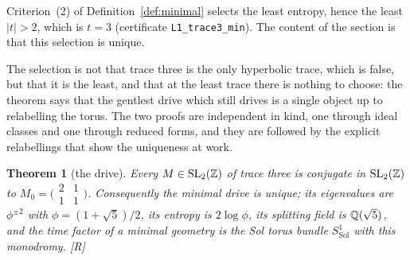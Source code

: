 \documentclass[11pt,a4paper]{article}
\theoremstyle{plain}
\newtheorem{theorem}{Theorem}[section]
\theoremstyle{definition}
\theoremstyle{remark}
\newcommand{\Sol}{\mathrm{Sol}}
\newcommand{\rigR}{[\textup{R}]}
\begin{document}
Criterion~(2) of Definition~\ref{def:minimal} selects the least entropy, hence the least $\lvert t\rvert>2$, which is $t=3$ (certificate \texttt{L1\_trace3\_min}). The content of the section is that this selection is unique.

The selection is not that trace three is the only hyperbolic trace, which is false, but that it is the least, and that at the least trace there is nothing to choose: the theorem says that the gentlest drive which still drives is a single object up to relabelling the torus. The two proofs are independent in kind, one through ideal classes and one through reduced forms, and they are followed by the explicit relabellings that show the uniqueness at work.

\begin{theorem}[the drive]\label{thm:drive}
Every $M\in\mathrm{SL}_{2}(\mathbb{Z})$ of trace three is conjugate in $\mathrm{SL}_{2}(\mathbb{Z})$ to $M_{0}=\bigl(\begin{smallmatrix}2&1\\1&1\end{smallmatrix}\bigr)$. Consequently the minimal drive is unique; its eigenvalues are $\phi^{\pm2}$ with $\phi=(1+\sqrt5)/2$, its entropy is $2\log\phi$, its splitting field is $\mathbb{Q}(\sqrt5)$, and the time factor of a minimal geometry is the Sol torus bundle $S^{1}_{\Sol}$ with this monodromy. \rigR
\end{theorem}
\end{document}

